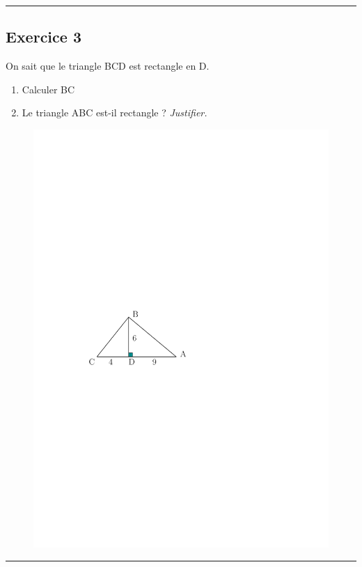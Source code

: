 \documentclass[12pt]{article}
\newcommand{\horrule}[1]{\rule{\linewidth}{#1}} %
\begin{document}
\horrule{1px}

\begin{multicols}{2}

  \subsection*{Exercice 3}
  On sait que le triangle BCD est rectangle en D.\\
  \begin{enumerate}
  \item Calculer BC
  \item Le triangle ABC est-il rectangle ? \textit{Justifier.}
  \end{enumerate}

  \begin{figure}[H]
    \centering
    \includegraphics[width=0.7\linewidth]{sources/1/exo3-tria.pdf}
  \end{figure}

\end{multicols}

\horrule{1px}
\end{document}
